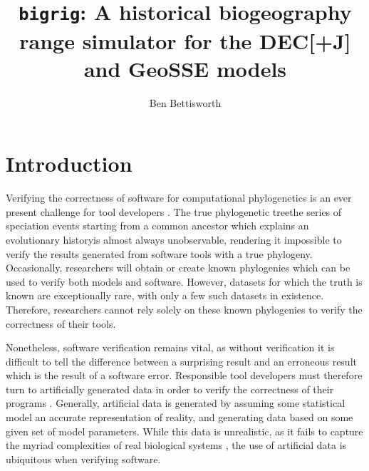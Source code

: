 \documentclass[a4paper]{article}
\title{\texttt{bigrig}: A historical biogeography range simulator for the
	DEC[+J] and GeoSSE models}
\author{Ben Bettisworth}
\begin{document}
\maketitle

\section{Introduction}

Verifying the correctness of software for computational phylogenetics is an ever present challenge for tool developers
\cite{carver_software_2007, bettisworth_lagrange-ng_2023}. 
The true phylogenetic tree\textemdash the series of speciation events starting from a common ancestor which explains an
evolutionary history\textemdash is almost always unobservable, rendering it impossible to verify the results generated
from software tools with a true phylogeny.
Occasionally, researchers will obtain or create known phylogenies \cite{hillis_experimental_1992} which can be used to
verify both models and software. 
However, datasets for which the truth is known are exceptionally rare, with only a few such datasets in existence.
Therefore, researchers cannot rely solely on these known phylogenies to verify the correctness of their tools.

Nonetheless, software verification remains vital, as without verification it is difficult to tell the difference between
a surprising result and an erroneous result which is the result of a software error.
Responsible tool developers must therefore turn to artificially generated data in order to verify the correctness of
their programs \cite{ly-trong_alisim_2022, fletcher_indelible_2009}.
Generally, artificial data is generated by assuming some statistical model an accurate representation of reality, and
generating data based on some given set of model parameters.
While this data is unrealistic, as it fails to capture the myriad complexities of real biological systems
\cite{trost_simulations_2024}, the use of artificial data is ubiquitous when verifying software.
\end{document}
